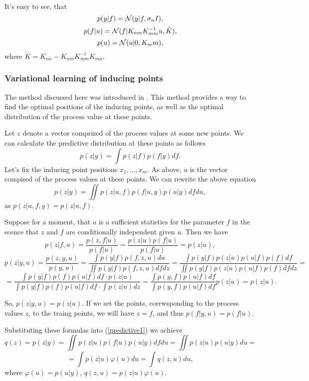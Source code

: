 \documentclass[12pt]{article}
\begin{document}
	It's easy to see, that
	$$p(y|f) = \mathcal{N} (y|f, \sigma_n I),$$
	$$p(f|u) = \mathcal{N} (f|K_{nm} K_{mm}^{-1}u, \tilde K),$$
	$$p(u) = \mathcal{N}(u|0, K_mm),$$
	where $\tilde K = K_{nn} - K_{nm} K_{mm}^{-1} K_{mn}.$
		
	\subsubsection{Variational learning of inducing points}
		\label{Titsias}
		
		\hspace{0.6cm}The method discussed here was introduced in \cite{Titsias}. This method provides a way to find the optimal positions of the inducing points, as well as the optimal distribution of the process value at these points.

		Let $z$ denote a vector comprized of the process values at some new points. We can calculate the predictive distribution at these points as follows
		$$p(z|y) = \int p(z|f) p(f|y) df.$$
		Let's fix the inducing point positions $x_1, \ldots, x_m$. As above, $u$ is the vector compised of the process values at these points. We can rewrite the above equation
		\begin{equation}
			\label{predictive1}
			p(z|y) = \iint p(z|u, f) p(f| u, y) p(u|y)df du,
		\end{equation}
		as $p(z|u, f, y) = p(z|u, f)$. 

		Suppose for a moment, that $u$ is a sufficient statistics for the parameter $f$ in the scence that $z$ and $f$ are conditionally independent given $u$. Then we have 
		$$p(z|f, u) = \frac {p(z, f|u)} {p(f|u)} = \frac {p(z | u) p(f | u)}{p(f|u)} = p(z|u),$$
		$$p(z|y, u) = \frac {p(z, y, u)}{p(y, u)} = \frac {\int p(y|f)p(f, z, u) du}{\iint p(y|f) p(f, z, u) df dz} = \frac {\int p(y|f) p(z|u) p(u|f) p(f)df}{\iint p(y|f) p(z|u) p(u|f) p(f)df dz} = $$
		$$= \frac {\int p(y|f)p(f)p(u|f)df \cdot p(z|u)} {\int p(y|f)p(f)p(u|f)df \cdot \int p(z|u) dz} = \frac{\int p(y, f) p(u|f) df} {\int p(y, f) p(u|f) df} p(z|u) = p(z|u).$$

		So, $p(z|y, u) = p(z|u)$. If we set the points, corrwsponding to the process values $z$, to the traing points, we will have $z = f$, and thus $p(f|y, u) = p(f|u)$.

		Substituting these formulas into (\ref{predictive1}) we achieve
		$$q(z) = p(z|y) = \iint p(z|u) p(f|u) p(u|y)df du = \iint p(z|u) p(u|y) du = $$
		\begin{equation}
			\label{predictive2}
			= \int p(z|u)\varphi(u) du  = \int q(z, u) du, 
		\end{equation}
		where $\varphi(u) = p(u|y)$, $q(z, u) = p(z|u)\varphi(u)$.
\end{document}
